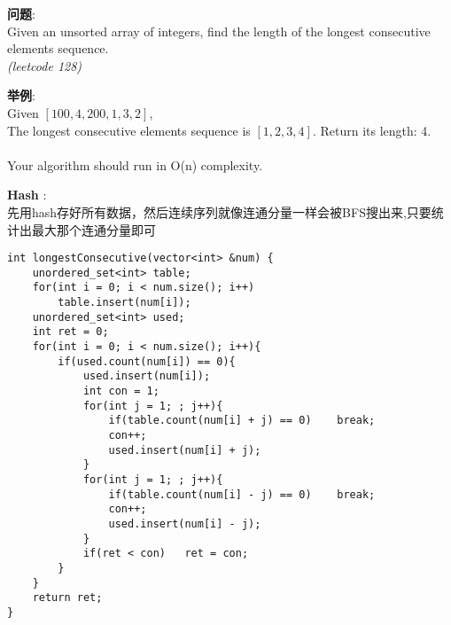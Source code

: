     
\begin{description}
    \item{\textbf{问题}}:\\
Given an unsorted array of integers, find the length of the longest consecutive elements sequence.\\
\textit{(leetcode 128)}
    \item{\textbf{举例}}:\\
Given $[100, 4, 200, 1, 3, 2]$, \\
The longest consecutive elements sequence is $[1, 2, 3, 4]$. Return its length: 4. \\
\\
Your algorithm should run in O(n) complexity.
    \item{\textbf{Hash}} : 
	\\先用hash存好所有数据，然后连续序列就像连通分量一样会被BFS搜出来,只要统计出最大那个连通分量即可
    \begin{lstlisting}
int longestConsecutive(vector<int> &num) {
	unordered_set<int> table;
	for(int i = 0; i < num.size(); i++)
		table.insert(num[i]);
	unordered_set<int> used;
	int ret = 0;
	for(int i = 0; i < num.size(); i++){
		if(used.count(num[i]) == 0){
			used.insert(num[i]);
			int con = 1;
			for(int j = 1; ; j++){
				if(table.count(num[i] + j) == 0)	break;
				con++;
				used.insert(num[i] + j);	
			}
			for(int j = 1; ; j++){
				if(table.count(num[i] - j) == 0)	break;
				con++;
				used.insert(num[i] - j);	
			}
			if(ret < con)	ret = con;
		}
	}
	return ret;
}
    \end{lstlisting}
\end{description}
